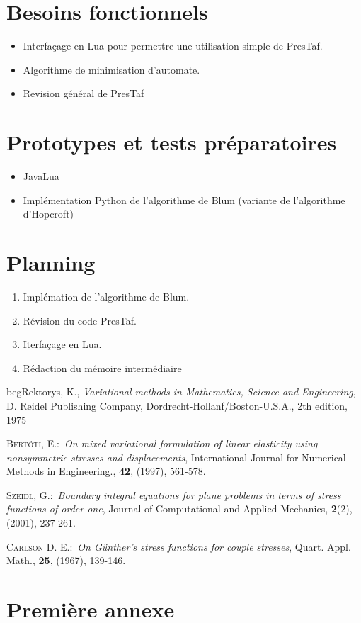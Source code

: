 \documentclass{article}%
\begin{document}
\section{Besoins fonctionnels}

\begin{itemize}
\item Interfa\c{c}age en Lua pour permettre une utilisation simple de PresTaf.
\item Algorithme de minimisation d'automate.
\item Revision g\'en\'eral de PresTaf
\end{itemize}

\section{Prototypes et tests pr\'eparatoires}

\begin{itemize}
  \item JavaLua
  \item Impl\'ementation Python de l'algorithme de Blum (variante de l'algorithme d'Hopcroft)
\end{itemize}


\section{Planning}

\begin{enumerate}
\item Impl\'emation de l'algorithme de Blum.
\item R\'evision du code PresTaf.
\item Iterfa\c{c}age en Lua.
\item R\'edaction du m\'emoire interm\'ediaire
\end{enumerate}

\begin{thebibliography}{9}                                                                                                %
begRektorys, K., \textit{Variational methods in Mathematics,
Science and Engineering}, D. Reidel Publishing Company,
Dordrecht-Hollanf/Boston-U.S.A., 2th edition, 1975

 \textsc{Bert\'{o}ti, E.}:\ \textit{On mixed variational formulation
of linear elasticity using nonsymmetric stresses and displacements}, International
Journal for Numerical Methods in Engineering., \textbf{42}, (1997), 561-578.

 \textsc{Szeidl, G.}:\ \textit{Boundary integral equations for
plane problems in terms of stress functions of order one}, Journal of Computational and
Applied Mechanics, \textbf{2}(2), (2001), 237-261.

  \textsc{Carlson D. E.}:\ \textit{On G\"{u}nther's stress functions
for couple stresses}, Quart. Appl. Math., \textbf{25}, (1967), 139-146.
\end{thebibliography}


\appendix

\section{Premi\`ere annexe}
\end{document}
